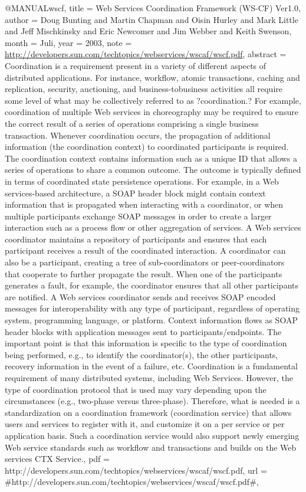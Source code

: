 @MANUAL{wscf,
  title = {{Web Services Coordination Framework (WS-CF) Ver1.0}},
  author = {Doug Bunting and Martin Chapman and Oisin Hurley and Mark Little
	and Jeff Mischkinsky and Eric Newcomer and Jim Webber and Keith Swenson},
  month = {Juli},
  year = {2003},
  note = {\url{http://developers.sun.com/techtopics/webservices/wscaf/wscf.pdf}},
  abstract = {Coordination is a requirement present in a
variety of different aspects
	of distributed applications. For instance,
workflow, atomic transactions,
	caching and replication, security,
auctioning, and business-tobusiness
	activities all require some level of
what may be collectively referred
	to as ?coordination.? For example,
coordination of multiple Web services
	in choreography may be required
to ensure the correct result of a
	series of operations comprising
a single business transaction. Whenever
	coordination occurs, the
propagation of additional information (the
	coordination context) to
coordinated participants is required. The
	coordination context contains
information such as a unique ID that
	allows a series of operations to
share a common outcome. The outcome
	is typically defined in terms
of coordinated state persistence operations.
	For example, in a Web
services-based architecture, a SOAP header
	block might contain context
information that is propagated when interacting
	with a coordinator, or when
multiple participants exchange SOAP messages
	in order to create a larger
interaction such as a process flow or
	other aggregation of services. A
Web services coordinator maintains
	a repository of participants and
ensures that each participant receives
	a result of the coordinated
interaction. A coordinator can also be
	a participant, creating a tree
of sub-coordinators or peer-coordinators
	that cooperate to further
propagate the result. When one of the participants
	generates a fault,
for example, the coordinator ensures that all
	other participants
are notified. A Web services coordinator sends
	and receives SOAP
encoded messages for interoperability with any
	type of participant,
regardless of operating system, programming
	language, or platform. Context
information flows as SOAP header blocks
	with application messages sent to
participants/endpoints. The important
	point is that this information is specific
to the type of coordination
	being performed, e.g., to identify the
coordinator(s), the other
	participants, recovery information in the event of
a failure, etc.
	Coordination is a fundamental requirement of many
distributed systems,
	including Web Services. However, the type of
coordination protocol
	that is used may vary depending upon the circumstances
(e.g., two-phase
	versus three-phase). Therefore, what is needed is a
standardization
	on a coordination framework (coordination service)
that allows users
	and services to register with it, and customize
it on a per service
	or per application basis. Such a coordination
service would also
	support newly emerging Web service standards such as
workflow and
	transactions and builds on the Web services CTX Service.},
  pdf = {http://developers.sun.com/techtopics/webservices/wscaf/wscf.pdf},
  url = {#http://developers.sun.com/techtopics/webservices/wscaf/wscf.pdf#},
}

